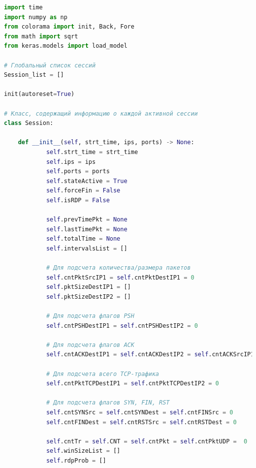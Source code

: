 \documentclass[bachelor, och, coursework]{SCWorks}
\begin{document}
    \begin{lstlisting}[language=Python]
import time
import numpy as np
from colorama import init, Back, Fore
from math import sqrt
from keras.models import load_model

# Глобальный список сессий
Session_list = []

init(autoreset=True)

# Класс, содержащий информацию о каждой активной сессии
class Session:

    def __init__(self, strt_time, ips, ports) -> None:
            self.strt_time = strt_time
            self.ips = ips
            self.ports = ports
            self.stateActive = True
            self.forceFin = False
            self.isRDP = False

            self.prevTimePkt = None
            self.lastTimePkt = None
            self.totalTime = None
            self.intervalsList = []

            # Для подсчета количества/размера пакетов
            self.cntPktSrcIP1 = self.cntPktDestIP1 = 0
            self.pktSizeDestIP1 = []
            self.pktSizeDestIP2 = []

            # Для подсчета флагов PSH
            self.cntPSHDestIP1 = self.cntPSHDestIP2 = 0

            # Для подсчета флагов ACK
            self.cntACKDestIP1 = self.cntACKDestIP2 = self.cntACKSrcIP1 = 0

            # Для подсчета всего TCP-трафика
            self.cntPktTCPDestIP1 = self.cntPktTCPDestIP2 = 0

            # Для подсчета флагов SYN, FIN, RST
            self.cntSYNSrc = self.cntSYNDest = self.cntFINSrc = 0
            self.cntFINDest = self.cntRSTSrc = self.cntRSTDest = 0

            self.cntTr = self.CNT = self.cntPkt = self.cntPktUDP =  0
            self.winSizeList = []
            self.rdpProb = []


\end{lstlisting}
\end{document}
